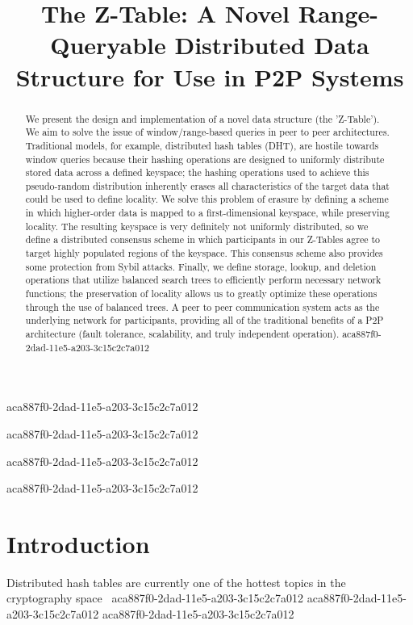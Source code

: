 \documentclass[12pt]{article}
\title{The Z-Table: A Novel Range-Queryable Distributed Data Structure for Use in P2P Systems}
\begin{document}
aca887f0-2dad-11e5-a203-3c15c2c7a012
\maketitle

aca887f0-2dad-11e5-a203-3c15c2c7a012\begin{abstract}
We present the design and implementation of a novel data structure (the 'Z-Table'). We aim to solve the issue of window/range-based queries in peer to peer architectures. Traditional models, for example,  distributed hash tables (DHT), are hostile towards window queries because their hashing operations are designed to uniformly distribute stored data across a defined keyspace; the hashing operations used to achieve this pseudo-random distribution inherently erases all characteristics of the target data that could be used to define locality. We solve this problem of erasure by defining a scheme in which higher-order data is mapped to a first-dimensional keyspace, while preserving locality. The resulting keyspace is very definitely not uniformly distributed, so we define a distributed consensus scheme in which participants in our Z-Tables agree to target highly populated regions of the keyspace. This consensus scheme also provides some protection from Sybil attacks. Finally, we define storage, lookup, and deletion operations that utilize balanced search trees to efficiently perform necessary network functions; the preservation of locality allows us to greatly optimize these operations through the use of balanced trees. A peer to peer communication system acts as the underlying network for participants, providing all of the traditional benefits of a P2P architecture (fault tolerance, scalability, and truly independent operation).
aca887f0-2dad-11e5-a203-3c15c2c7a012\end{abstract}
aca887f0-2dad-11e5-a203-3c15c2c7a012

aca887f0-2dad-11e5-a203-3c15c2c7a012\newpage
\section{Introduction}
Distributed hash tables are currently one of the hottest topics in the cryptography space~\cite{Stoica:2001dj,Rowstron:2001ea,Ratnasamy:2001wn}
aca887f0-2dad-11e5-a203-3c15c2c7a012
aca887f0-2dad-11e5-a203-3c15c2c7a012\printbibliography
aca887f0-2dad-11e5-a203-3c15c2c7a012
\end{document}
